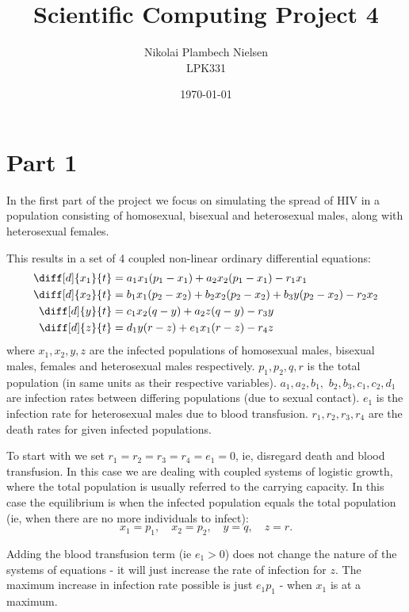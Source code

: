 \documentclass[a4paper,10pt]{article}
\title{Scientific Computing Project 4}
\author{Nikolai Plambech Nielsen\\LPK331}
\date{\today}
\begin{document}
	\maketitle
	\section*{Part 1}
	In the first part of the project we focus on simulating the spread of HIV in a population consisting of homosexual, bisexual and heterosexual males, along with heterosexual females.
	
	This results in a set of 4 coupled non-linear ordinary differential equations:
	\begin{align}
		\diff[d]{x_1}{t} &= a_1 x_1 (p_1-x_1) + a_2 x_2 ( p_1-x_1) - r_1 x_1 \\
		\diff[d]{x_2}{t} &= b_1 x_1 (p_2-x_2) + b_2 x_2 ( p_2-x_2) +  b_3 y(p_2-x_2) - r_2 x_2 \\
		\diff[d]{y}{t} &= c_1 x_2 (q-y) + a_2 z (q-y) - r_3 y \\
		\diff[d]{z}{t} &= d_1 y (r-z) + e_1 x_1 (r-z) - r_4 z	
	\end{align}
	where $ x_1, x_2, y, z $ are the infected populations of homosexual males, bisexual males, females and heterosexual males respectively. $ p_1, p_2, q, r $ is the total population (in same units as their respective variables). $ a_1, a_2, b_1,$ $ b_2, b_3, c_1, c_2, d_1 $ are infection rates between differing populations (due to sexual contact). $ e_1 $ is the infection rate for heterosexual males due to blood transfusion. $ r_1, r_2, r_3, r_4 $ are the death rates for given infected populations.
	
	To start with we set $ r_1 = r_2 = r_3 = r_4 = e_1 = 0$, ie, disregard death and blood transfusion. In this case we are dealing with coupled systems of logistic growth, where the total population is usually referred to the carrying capacity. In this case the equilibrium is when the infected population equals the total population (ie, when there are no more individuals to infect):
	\begin{equation}
		x_1 = p_1, \quad x_2=p_2, \quad y=q, \quad z=r.
	\end{equation}
	
	Adding the blood transfusion term (ie $ e_1 > 0 $) does not change the nature of the systems of equations - it will just increase the rate of infection for $ z $. The maximum increase in infection rate possible is just $ e_1p_1 $ - when $ x_1 $ is at a maximum.
	
\end{document}

